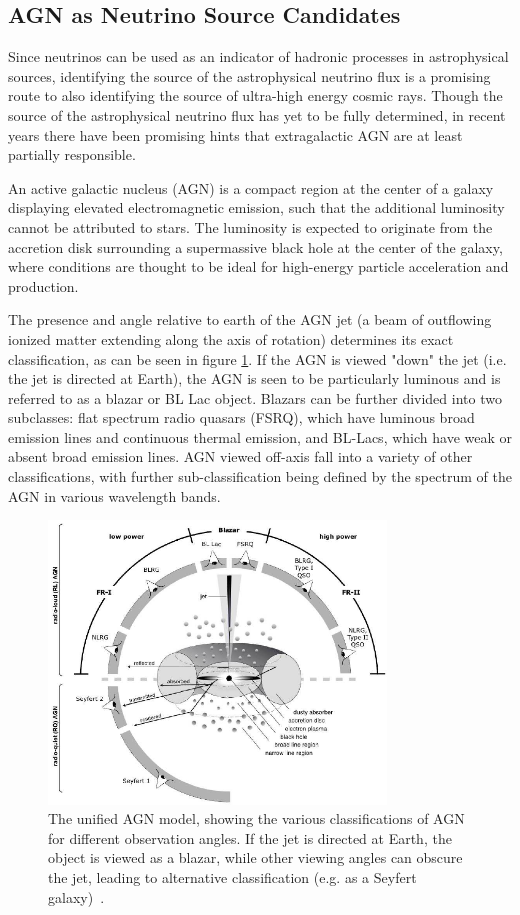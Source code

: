 \subsection{AGN as Neutrino Source Candidates}
Since neutrinos can be used as an indicator of hadronic processes in astrophysical sources, identifying the source of the astrophysical neutrino flux is a promising route to also identifying the source of ultra-high energy cosmic rays. Though the source of the astrophysical neutrino flux has yet to be fully determined, in recent years there have been promising hints that extragalactic AGN are at least partially responsible.

An active galactic nucleus (AGN) is a compact region at the center of a galaxy displaying elevated electromagnetic emission, such that the additional luminosity cannot be attributed to stars. The luminosity is expected to originate from the accretion disk surrounding a supermassive black hole at the center of the galaxy, where conditions are thought to be ideal for high-energy particle acceleration and production.

The presence and angle relative to earth of the AGN jet (a beam of outflowing ionized matter extending along the axis of rotation) determines its exact classification, as can be seen in figure \ref{fig:AGNfig}. If the AGN is viewed "down" the jet (i.e. the jet is directed at Earth), the AGN is seen to be particularly luminous and is referred to as a blazar or BL Lac object. Blazars can be further divided into two subclasses: flat spectrum radio quasars (FSRQ), which have luminous broad emission lines and continuous thermal emission, and BL-Lacs, which have weak or absent broad emission lines. AGN viewed off-axis fall into a variety of other classifications, with further sub-classification being defined by the spectrum of the AGN in various wavelength bands.

\begin{figure}[h]
\centering
\includegraphics[width=0.8\textwidth]{figs/AGNfig.png}
\caption{The unified AGN model, showing the various classifications of AGN for different observation angles. If the jet is directed at Earth, the object is viewed as a blazar, while other viewing angles can obscure the jet, leading to alternative classification (e.g. as a Seyfert galaxy)~\cite{AGN_model_src}. }
\label{fig:AGNfig}
\end{figure}

